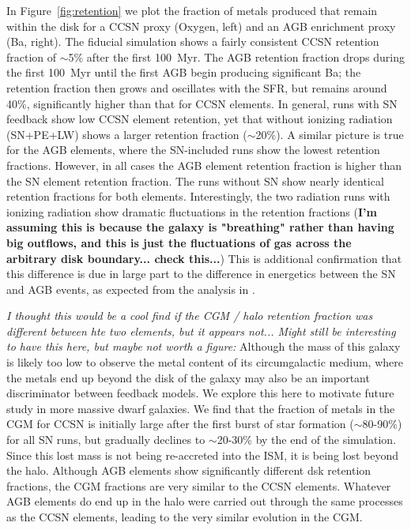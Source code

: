 \documentclass[twocolumn]{aastex62}
\begin{document}
In Figure~\ref{fig:retention} we plot the fraction of metals produced that remain within the disk for a CCSN proxy (Oxygen, left) and an AGB enrichment proxy (Ba, right). The fiducial simulation shows a fairly consistent CCSN retention fraction of $\sim$5\% after the first 100~Myr. The AGB retention fraction drops during the first 100~Myr until the first AGB begin producing significant Ba; the retention fraction then grows and oscillates with the SFR, but remains around 40\%, significantly higher than that for CCSN elements. In general, runs with SN feedback show low CCSN element retention, yet that without ionizing radiation (SN+PE+LW) shows a larger retention fraction ($\sim$20\%). A similar picture is true for the AGB elements, where the SN-included runs show the lowest retention fractions. However, in all cases the AGB element retention fraction is higher than the SN element retention fraction. The runs without SN show nearly identical retention fractions for both elements. Interestingly, the two radiation runs with ionizing radiation show dramatic fluctuations in the retention fractions (\textbf{I'm assuming this is because the galaxy is "breathing" rather than having big outflows, and this is just the fluctuations of gas across the arbitrary disk boundary... check this...}) This is additional confirmation that this difference is due in large part to the difference in energetics between the SN and AGB events, as expected from the analysis in \cite{Emerick2020a}. 

\textit{I thought this would be a cool find if the CGM / halo retention fraction was different between hte two elements, but it appears not... Might still be interesting to have this here, but maybe not worth a figure:} Although the mass of this galaxy is likely too low to observe the metal content of its circumgalactic medium, where the metals end up beyond the disk of the galaxy may also be an important discriminator between feedback models. We explore this here to motivate future study in more massive dwarf galaxies. We find that the fraction of metals in the CGM for CCSN is initially large after the first burst of star formation ($\sim$80-90\%) for all SN runs, but gradually declines to $\sim$20-30\% by the end of the simulation. Since this lost mass is not being re-accreted into the ISM, it is being lost beyond the halo. Although AGB elements show significantly different dsk retention fractions, the CGM fractions are very similar to the CCSN elements. Whatever AGB elements do end up in the halo were carried out through the same processes as the CCSN elements, leading to the very similar evolution in the CGM. %
\end{document}
